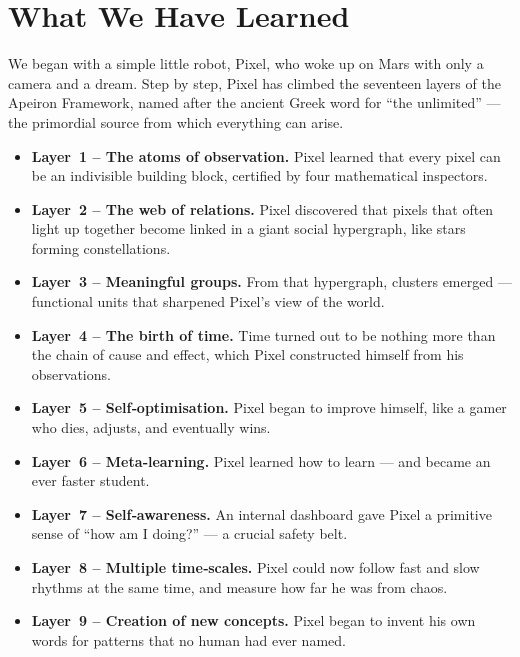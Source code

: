 \section{What We Have Learned}
\label{sec:summary}

We began with a simple little robot, Pixel, who woke up on Mars with
only a camera and a dream.  Step by step, Pixel has climbed the
seventeen layers of the Apeiron Framework, named after the ancient
Greek word for “the unlimited” — the primordial source from which
everything can arise.

\begin{itemize}
    \item \textbf{Layer~1 – The atoms of observation.}
    Pixel learned that every pixel can be an indivisible building block,
    certified by four mathematical inspectors.

    \item \textbf{Layer~2 – The web of relations.}
    Pixel discovered that pixels that often light up together become
    linked in a giant social hypergraph, like stars forming
    constellations.

    \item \textbf{Layer~3 – Meaningful groups.}
    From that hypergraph, clusters emerged — functional units that
    sharpened Pixel's view of the world.

    \item \textbf{Layer~4 – The birth of time.}
    Time turned out to be nothing more than the chain of cause and
    effect, which Pixel constructed himself from his observations.

    \item \textbf{Layer~5 – Self‑optimisation.}
    Pixel began to improve himself, like a gamer who dies, adjusts,
    and eventually wins.

    \item \textbf{Layer~6 – Meta‑learning.}
    Pixel learned how to learn — and became an ever faster student.

    \item \textbf{Layer~7 – Self‑awareness.}
    An internal dashboard gave Pixel a primitive sense of “how am I
    doing?” — a crucial safety belt.

    \item \textbf{Layer~8 – Multiple time‑scales.}
    Pixel could now follow fast and slow rhythms at the same time, and
    measure how far he was from chaos.

    \item \textbf{Layer~9 – Creation of new concepts.}
    Pixel began to invent his own words for patterns that no human had
    ever named.


\end{itemize}
